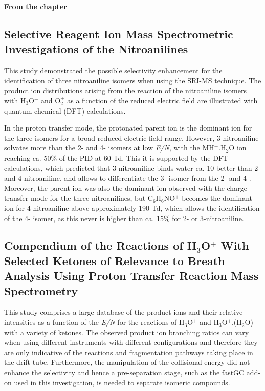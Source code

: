 \vspace{1.5in}\textbf{From the chapter}


\newpage
\subsection{Selective Reagent Ion Mass Spectrometric Investigations of the Nitroanilines}

This study demonstrated the possible selectivity enhancement for the identification of three nitroaniline isomers when using the SRI-MS technique.
%
The product ion distributions arising from the reaction of the nitroaniline isomers with H$_3$O$^+$ and O$_2^+$ as a function of the reduced electric field are illustrated with quantum chemical  (DFT) calculations.

In the proton transfer mode, the protonated parent ion is the dominant ion for the three isomers for a broad reduced electric field range.
%
However, 3-nitroaniline solvates more than the 2- and 4- isomers at low \textit{E/N}, with the MH$^+$.H$_2$O ion reaching ca. 50\% of the PID at 60 Td.
%
This it is supported by the DFT calculations, which predicted that 3-nitroaniline binds water ca. 10 better than 2- and 4-nitroaniline, and allows to differentiate the 3- isomer from the 2- and 4-.
%
Moreover, the parent ion was also the dominant ion observed with the charge transfer mode for the three nitroanilines, but C$_6$H$_6$NO$^+$ becomes the dominant ion for 4-nitroaniline above approximately 190 Td, which allows the identification of the 4- isomer, as this never is higher than ca. 15\% for 2- or 3-nitroaniline.


\subsection{Compendium of the Reactions of H$_3$O$^+$ With Selected Ketones of Relevance
to Breath Analysis Using Proton Transfer Reaction Mass Spectrometry}

This study comprises a large database of the product ions and their relative intensities as a function of the \textit{E/N} for the reactions of H$_3$O$^+$ and H$_3$O$^+$.(H$_2$O) with a variety of ketones.
%
The observed product ion branching ratios can vary when using different instruments with different configurations and therefore they are only indicative of the reactions and fragmentation pathways taking place in the drift tube.
%
Furthermore, the manipulation of the collisional energy did not enhance the selectivity 
and hence a pre-separation stage, such as the fastGC add-on used in this investigation, is needed to separate isomeric compounds.

